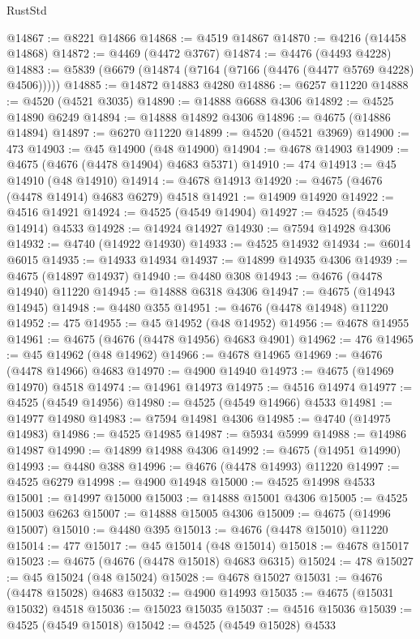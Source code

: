 \begin{lexlean}{RustStd}
\begin{coremodule}
{\begin{coremodule}
{{{{{{{{{{{{{{{{{{{{{{{{{{{{{{{{{{{{{{{{{{{{{{{{{{{{{{{{{{{{@14867 := @8221 @14866
@14868 := @4519 @14867
@14870 := @4216 (@14458 @14868)
@14872 := @4469 (@4472 @3767)
@14874 := @4476 (@4493 @4228)
@14883 := @5839 (@6679 (@14874 (@7164 (@7166 (@4476 (@4477 @5769 @4228) @4506)))))
@14885 := @14872 @14883 @4280
@14886 := @6257 @11220
@14888 := @4520 (@4521 @3035)
@14890 := @14888 @6688 @4306
@14892 := @4525 @14890 @6249
@14894 := @14888 @14892 @4306
@14896 := @4675 (@14886 @14894)
@14897 := @6270 @11220
@14899 := @4520 (@4521 @3969)
@14900 := 473
@14903 := @45 @14900 (@48 @14900)
@14904 := @4678 @14903
@14909 := @4675 (@4676 (@4478 @14904) @4683 @5371)
@14910 := 474
@14913 := @45 @14910 (@48 @14910)
@14914 := @4678 @14913
@14920 := @4675 (@4676 (@4478 @14914) @4683 @6279) @4518
@14921 := @14909 @14920
@14922 := @4516 @14921
@14924 := @4525 (@4549 @14904)
@14927 := @4525 (@4549 @14914) @4533
@14928 := @14924 @14927
@14930 := @7594 @14928 @4306
@14932 := @4740 (@14922 @14930)
@14933 := @4525 @14932
@14934 := @6014 @6015
@14935 := @14933 @14934
@14937 := @14899 @14935 @4306
@14939 := @4675 (@14897 @14937)
@14940 := @4480 @308
@14943 := @4676 (@4478 @14940) @11220
@14945 := @14888 @6318 @4306
@14947 := @4675 (@14943 @14945)
@14948 := @4480 @355
@14951 := @4676 (@4478 @14948) @11220
@14952 := 475
@14955 := @45 @14952 (@48 @14952)
@14956 := @4678 @14955
@14961 := @4675 (@4676 (@4478 @14956) @4683 @4901)
@14962 := 476
@14965 := @45 @14962 (@48 @14962)
@14966 := @4678 @14965
@14969 := @4676 (@4478 @14966) @4683
@14970 := @4900 @14940
@14973 := @4675 (@14969 @14970) @4518
@14974 := @14961 @14973
@14975 := @4516 @14974
@14977 := @4525 (@4549 @14956)
@14980 := @4525 (@4549 @14966) @4533
@14981 := @14977 @14980
@14983 := @7594 @14981 @4306
@14985 := @4740 (@14975 @14983)
@14986 := @4525 @14985
@14987 := @5934 @5999
@14988 := @14986 @14987
@14990 := @14899 @14988 @4306
@14992 := @4675 (@14951 @14990)
@14993 := @4480 @388
@14996 := @4676 (@4478 @14993) @11220
@14997 := @4525 @6279
@14998 := @4900 @14948
@15000 := @4525 @14998 @4533
@15001 := @14997 @15000
@15003 := @14888 @15001 @4306
@15005 := @4525 @15003 @6263
@15007 := @14888 @15005 @4306
@15009 := @4675 (@14996 @15007)
@15010 := @4480 @395
@15013 := @4676 (@4478 @15010) @11220
@15014 := 477
@15017 := @45 @15014 (@48 @15014)
@15018 := @4678 @15017
@15023 := @4675 (@4676 (@4478 @15018) @4683 @6315)
@15024 := 478
@15027 := @45 @15024 (@48 @15024)
@15028 := @4678 @15027
@15031 := @4676 (@4478 @15028) @4683
@15032 := @4900 @14993
@15035 := @4675 (@15031 @15032) @4518
@15036 := @15023 @15035
@15037 := @4516 @15036
@15039 := @4525 (@4549 @15018)
@15042 := @4525 (@4549 @15028) @4533
}}}}}}}}}}}}}}}}}}}}}}}}}}}}}}}}}}}}}}}}}}}}}}}}}}}}}}}}}}}}
\end{coremodule}}
\end{coremodule}
\end{lexlean}
